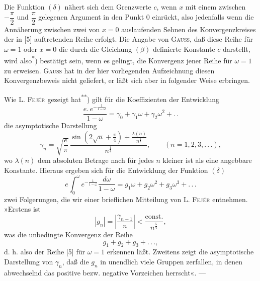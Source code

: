 \indent Die Funktion \((\delta)\) nähert sich dem Grenzwerte \(c\), wenn \(x\) mit einem zwischen \(-\dfrac\pi2\) und \(\dfrac\pi2\) gelegenen Argument in den Punkt \(0\) einrückt, also jedenfalls wenn die Annäherung zwischen zwei von \(x=0\) auslaufenden Sehnen des Konvergenzkreises der in [5] auftretenden Reihe erfolgt. Die Angabe von \textsc{Gauss}, daß diese Reihe für \(\omega=1\) oder \(x=0\) die durch die Gleichung \((\beta)\) definierte Konstante \(c\) darstellt, wird also\textsuperscript{*}) bestätigt sein, wenn es gelingt, die Konvergenz jener Reihe für \(\omega=1\) zu erweisen. \textsc{Gauss} hat in der hier vorliegenden Aufzeichnung diesen Konvergenzbeweis nicht geliefert, er läßt sich aber in folgender Weise erbringen.

\indent Wie L. \textsc{Fejér} gezeigt hat\textsuperscript{**}) gilt für die Koeffizienten der Entwicklung
\[
\frac{e{.}\,e^{-\frac1{1-\omega}}}{1-\omega}=\gamma_0+\gamma_1\omega+\gamma_2\omega^2+{.}\,{.}
\]
\noindent die asymptotische Darstellung
\[
\gamma_n=\sqrt{\frac e\pi}\,\frac{\sin\left(2\surd n+\frac\pi4\right)+\frac{\lambda(n)}{n^{\frac14}}}{n^{\frac14}},\qquad(n=1,2,3,{.}\,{.}\,{.}),
\]
\noindent wo \(\lambda(n)\) dem absoluten Betrage nach für jedes \(n\) kleiner ist als eine angebbare Konstante. Hieraus ergeben sich für die Entwicklung der Funktion \((\delta)\)
\[
e\int_0^\omega e^{-\frac1{1-\omega}}\frac{d\omega}{1-\omega}=g_1\omega+g_2\omega^2+g_3\omega^3+{.}\,{.}\,{.}
\]
\noindent zwei Folgerungen, die wir einer brieflichen Mitteilung von L. \textsc{Fejér} entnehmen. »Erstens ist
\[
|g_n|=\left|\frac{\gamma_{n-1}}n\right|<\frac{\text{const.}}{n^{\frac54}},
\]
\noindent was die unbedingte Konvergenz der Reihe
\[
g_1+g_2+g_3+{.}\,{.}\,{.},
\]
\noindent d. h. also der Reihe [5] für \(\omega=1\) erkennen läßt. Zweitens zeigt die asymptotische Darstellung von \(\gamma_n\), daß die \(g_n\) in unendlich viele Gruppen zerfallen, in denen abwechselnd das positive bezw. negative Vorzeichen herrscht«. —

